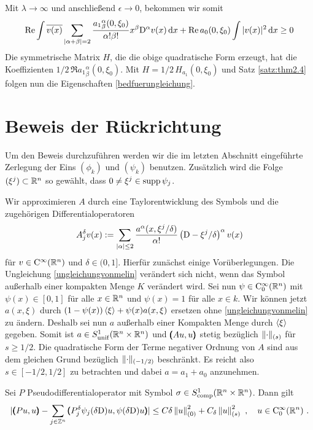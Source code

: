 Mit $\lambda\to\infty$ und anschließend $\epsilon \to 0$, bekommen wir somit
\begin{align}
\operatorname{Re}\int \overline{v(x)}\sum_{\lvert\alpha+\beta\rvert=2}\frac{{a_1}^\alpha_\beta(0,\xi_0)}{\alpha!\beta!}x^\beta\mathrm D^\alpha v(x)\,\mathrm d x + \operatorname{Re} a_0(0,\xi_0)\int|v(x)|^2\,\mathrm d x\ge 0
\end{align}
Die symmetrische Matrix $H$, die die obige quadratische Form erzeugt, hat die Koeffizienten $1/2\,\Re {a_1}^\alpha_\beta(0,\xi_0)$. Mit $H=1/2\, H_{a_1}(0,\xi_0)$ und Satz \ref{satz:thm2.4} folgen nun die Eigenschaften \eqref{bedfuerungleichung}.

\section{Beweis der Rückrichtung}

Um den Beweis durchzuführen werden wir die im letzten Abschnitt eingeführte Zerlegung der Eins $(\phi_k)$ und $(\psi_k)$ benutzen. Zusätzlich wird die Folge $(\xi^j)\subset \mathbb R^n$ so gewählt, dass $0\neq \xi^j\in\operatorname{supp} \psi_j$.

Wir approximieren $A$ durch eine Taylorentwicklung des Symbols und die zugehörigen Differentialoperatoren
\begin{align}
 A_j^\delta v (x):=\sum_{\lvert\alpha\rvert \le 2} \frac{a^\alpha(x,\xi^j/\delta)}{\alpha!}\left( \mathrm D - \xi^j/\delta\right)^\alpha v(x)
\end{align}
für $v\in\mathrm {C}^\infty(\mathbb R^n)$ und $\delta\in(0,1]$. Hierfür zunächst einige Vorüberlegungen. Die Ungleichung \eqref{ungleichungvonmelin} verändert sich nicht, wenn das Symbol außerhalb einer kompakten Menge $K$ verändert wird. Sei nun $\psi\in\mathrm{C}^\infty_0(\mathbb R^n)$ mit $\psi(x)\in[0,1]$ für alle $x\in\mathbb R^n$ und $\psi(x)=1$ für alle $x\in k$. Wir können jetzt $a(x,\xi)$ durch $(1-\psi(x))\braket{\xi} + \psi(x)a(x,\xi)$ ersetzen ohne \eqref{ungleichungvonmelin} zu ändern. Deshalb sei nun $a$ außerhalb einer Kompakten Menge durch $\braket{\xi}$ gegeben. Somit ist $a\in S_\mathrm{unif}^1(\mathbb R^n\times\mathbb R^n)$ und $\pmb(Au,u\pmb)$ stetig bezüglich $\lVert\cdot\rVert _{(s)}$ für $s\ge 1/2$. Die quadratische Form der Terme negativer Ordnung von $A$ sind aus dem gleichen Grund bezüglich $\lVert\cdot\rVert _{(-1/2)}$ beschränkt. Es reicht also $s\in[-1/2, 1/2]$ zu betrachten und dabei $a=a_1+a_0$ anzunehmen.

\begin{lem}
Sei $P$ Pseudodifferentialoperator mit Symbol $\sigma\in S^1_{\rm comp}(\mathbb R^n\times\mathbb R^n)$. Dann gilt
\begin{align}\label{hilfsungl1}
\lvert
\pmb(P u,u\pmb) - \sum_{j\in\mathbb Z^n}\pmb( P_j^\delta\psi_j(\delta\mathrm D )u, \psi(\delta\mathrm D )u \pmb)
\rvert
\le C\delta \left\lVert u\right\rVert ^2_{(0)} + C_\delta \left\lVert u\right\rVert ^2_{(s)}\ ,\quad u\in\mathrm {C}^\infty_0(\mathbb R^n)\ .
\end{align}
\end{lem}

